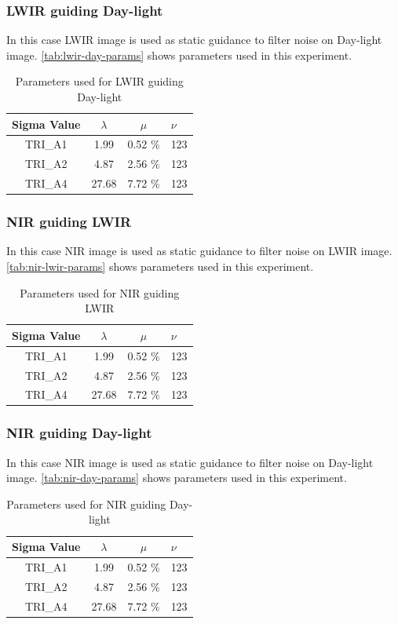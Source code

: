 \documentclass[10pt,twocolumn,letterpaper]{article}
\begin{document}
\subsubsection{LWIR guiding Day-light}
In this case LWIR image is used as static guidance to filter noise on Day-light image. \autoref{tab:lwir-day-params} shows parameters used in this experiment.
\begin{table}[!ht]
	\centering
	\caption{Parameters used for LWIR guiding Day-light}
	\label{tab:lwir-day-params}
	\begin{tabular}{@{}cccl@{}}
		\toprule
		\bfseries Sigma Value & \(\lambda\) & \(\mu\) & \(\nu\) \\ \midrule
		TRI\_A1               & 1.99        & 0.52 \% & 123       \\
		TRI\_A2               & 4.87        & 2.56 \% & 123        \\
		TRI\_A4               & 27.68       & 7.72 \% & 123        \\ \bottomrule
	\end{tabular}
\end{table}
\subsubsection{NIR guiding LWIR}
In this case NIR image is used as static guidance to filter noise on LWIR image. \autoref{tab:nir-lwir-params} shows parameters used in this experiment.
\begin{table}[!ht]
	\centering
	\caption{Parameters used for NIR guiding LWIR}
	\label{tab:nir-lwir-params}
	\begin{tabular}{@{}cccl@{}}
		\toprule
		\bfseries Sigma Value & \(\lambda\) & \(\mu\) & \(\nu\) \\ \midrule
		TRI\_A1               & 1.99        & 0.52 \% & 123       \\
		TRI\_A2               & 4.87        & 2.56 \% & 123        \\
		TRI\_A4               & 27.68       & 7.72 \% & 123        \\ \bottomrule
	\end{tabular}
\end{table}
\subsubsection{NIR guiding Day-light}
In this case NIR image is used as static guidance to filter noise on Day-light image. \autoref{tab:nir-day-params} shows parameters used in this experiment.
\begin{table}[!ht]
	\centering
	\caption{Parameters used for NIR guiding Day-light}
	\label{tab:nir-day-params}
	\begin{tabular}{@{}cccl@{}}
		\toprule
		\bfseries Sigma Value & \(\lambda\) & \(\mu\) & \(\nu\) \\ \midrule
		TRI\_A1               & 1.99        & 0.52 \% & 123       \\
		TRI\_A2               & 4.87        & 2.56 \% & 123        \\
		TRI\_A4               & 27.68       & 7.72 \% & 123        \\ \bottomrule
	\end{tabular}
\end{table}
\end{document}
